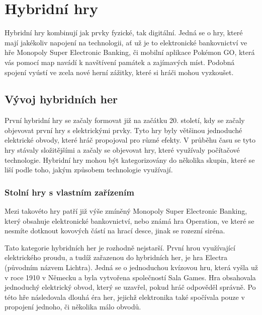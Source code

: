 \chapter{Hybridní hry}
Hybridní hry kombinují jak prvky fyzické, tak digitální. Jedná se o hry, které mají jakékoliv napojení na technologii, ať už je to elektronické bankovnictví ve hře Monopoly Super Electronic Banking, či mobilní aplikace Pokémon GO, která vás pomocí map navádí k navštívení památek a zajímavých míst. Podobná spojení vyústí ve zcela nové herní zážitky, které si hráči mohou vyzkoušet.\cite{hybrid_board_games_design}

\section{Vývoj hybridních her}
První hybridní hry se začaly formovat již na začátku 20. století, kdy se začaly objevovat první hry s elektrickými prvky. Tyto hry byly většinou jednoduché elektrické obvody, které hráč propojoval pro různé efekty. V průběhu času se tyto hry stávaly složitějšími a začaly se objevovat hry, které využívaly počítačové technologie. Hybridní hry mohou být kategorizovány do několika skupin, které se liší podle toho, jakým způsobem technologie využívají.\cite{history_of_hybrid_games}

\subsection{Stolní hry s vlastním zařízením}
Mezi takovéto hry patří již výše zmíněný Monopoly Super Electronic Banking, který obsahuje elektronické bankovnictví, nebo známá hra Operation, ve které se nesmíte dotknout kovových částí na hrací desce, jinak se rozezní siréna. 

Tato kategorie hybridních her je rozhodně nejstarší. První hrou využívající elektrického proudu, a tudíž zařazenou do hybridních her, je hra Electra (původním názvem Lichtra). Jedná se o jednoduchou kvízovou hru, která vyšla už v roce 1910 v Německu a byla vytvořena společností Sala Games. Hra obsahovala jednoduchý elektrický obvod, který se uzavřel, pokud hráč odpověděl správně. Po této hře následovala dlouhá éra her, jejichž elektronika také spočívala pouze v propojení jednoho, či několika málo obvodů.\cite{history_of_hybrid_games, boardgames_with_apps}

